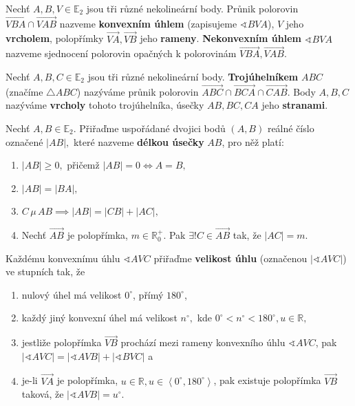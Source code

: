 \begin{definition}
  Nechť $A,B,V \in \mathbb E_2$ jsou tři různé nekolineární body. Průnik polorovin $\overrightarrow{VBA} \cap \overrightarrow{VAB}$ nazveme \textbf{konvexním úhlem}
  (zapisujeme $\sphericalangle BVA$), $V$ jeho \textbf{vrcholem}, polopřímky $\overrightarrow{VA}, \overrightarrow{VB}$ jeho \textbf{rameny}.
  \textbf{Nekonvexním úhlem} $\sphericalangle BVA$ nazveme sjednocení polorovin opačných k polorovinám $\overrightarrow{VBA},\overrightarrow{VAB}.$
\end{definition}

\begin{definition}
  Nechť $A,B,C\in \mathbb E_2$ jsou tři různé nekolineární body. \textbf{Trojúhelníkem} $ABC$ (značíme $\triangle ABC$) nazýváme průnik polorovin $\overrightarrow{ABC} \cap \overrightarrow{BCA} \cap \overrightarrow{CAB}$. Body $A,B,C$ nazýváme \textbf{vrcholy} tohoto trojúhelníka, úsečky $AB, BC, CA$ jeho \textbf{stranami}.
\end{definition}

\begin{definition}
  Nechť $A,B\in \mathbb E_2.$ Přiřaďme uspořádané dvojici bodů $(A,B)$ reálné číslo označené $|AB|,$ které nazveme \textbf{délkou úsečky} $AB$, pro něž platí:
  \begin{enumerate}[$i.$]
    \item $|AB|\geq 0,$ přičemž $|AB|=0 \iff A=B,$
    \item $|AB|=|BA|,$
    \item $C\, \mu \, AB \implies |AB|=|CB|+|AC|,$
    \item Nechť $\overrightarrow{AB}$ je polopřímka, $m\in \mathbb R^+_0.$ Pak $\exists ! C\in \overrightarrow{AB}$ tak, že $|AC|=m.$
  \end{enumerate}
\end{definition}

\begin{definition}
  Každému konvexnímu úhlu $\sphericalangle AVC$ přiřaďme \textbf{velikost úhlu} (označenou $|\sphericalangle AVC|$) ve stupních tak, že
  \begin{enumerate}[$i.$]
    \item nulový úhel má velikost $0^\circ$, přímý $180^\circ$,
    \item každý jiný konvexní úhel má velikost $n^\circ, $ kde $0^\circ< n ^\circ< 180^\circ, u \in \mathbb R,$
    \item jestliže polopřímka $\overrightarrow{VB}$ prochází mezi rameny konvexního úhlu $\sphericalangle AVC$, pak $|\sphericalangle AVC|=|\sphericalangle AVB|+ |\sphericalangle BVC|$ a
    \item je-li $\overrightarrow{VA}$ je polopřímka, $u \in \mathbb R, u \in \left < 0 ^\circ,180^\circ \right >$, pak existuje polopřímka $\overrightarrow{VB}$ taková, že $|\sphericalangle AVB|=u^\circ.$
  \end{enumerate}
\end{definition}

